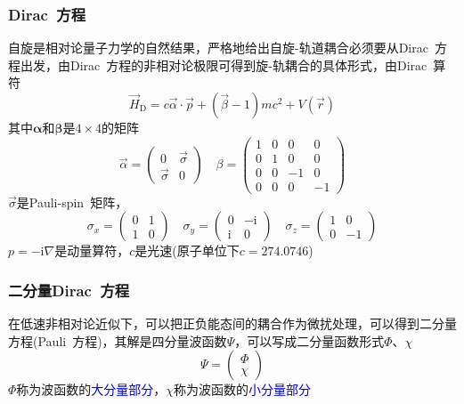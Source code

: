 {\frame
{
	\frametitle{\textrm{Dirac~}方程}
	自旋是相对论量子力学的自然结果，严格地给出自旋-轨道耦合必须要从\textrm{Dirac~}方程出发，由\textrm{Dirac~}方程的非相对论极限可得到旋-轨耦合的具体形式，由\textrm{Dirac~}算符
	\begin{displaymath}
		\vec H_{\mathrm D}=c\vec{\alpha}\cdot\vec p+(\vec{\beta}-1)mc^2+V(\vec r)
	\end{displaymath}
	其中$\mathbf{\alpha}$和$\mathbf{\beta}$是$4\times4$的矩阵
	\begin{displaymath}
		\vec{\alpha}=\left(
		\begin{matrix}
			0 &\vec{\sigma}\\
			\vec{\sigma} &0
		\end{matrix}
		\right)\quad\beta=\left(
		\begin{matrix}
			1 &0 &0 &0\\
			0 &1 &0 &0\\
			0 &0 &-1 &0\\
			0 &0 &0 &-1
		\end{matrix}
		\right)
	\end{displaymath}
	$\vec{\sigma}$是\textrm{Pauli-spin~}矩阵，
	\begin{displaymath}
		\sigma_x=\left( 
		\begin{matrix}
			0 &1\\
			1 &0
		\end{matrix}
		\right)\quad
		\sigma_y=\left( 
		\begin{matrix}
			0 &-\mathrm{i}\\
			\mathrm{i} &0
		\end{matrix}
		\right)\quad
		\sigma_z=\left( 
		\begin{matrix}
			1 &0\\
			0 &-1
		\end{matrix}
		\right)
	\end{displaymath}
	$p=-\mathrm{i}\nabla$是动量算符，$c$是光速(原子单位下$c=274.0746$)
}

\frame
{
	\frametitle{二分量\textrm{Dirac~}方程}
	在低速非相对论近似下，可以把正负能态间的耦合作为微扰处理，可以得到二分量方程(\textrm{Pauli~}方程)，其解是四分量波函数$\Psi$，可以写成二分量函数形式$\Phi$、$\chi$
	\begin{displaymath}
		\Psi=\left( 
		\begin{matrix}
			\Phi\\
			\chi
		\end{matrix}
		\right)
	\end{displaymath}
	$\Phi$称为波函数的\textcolor{blue}{大分量部分}，$\chi$称为波函数的\textcolor{blue}{小分量部分}

}}
